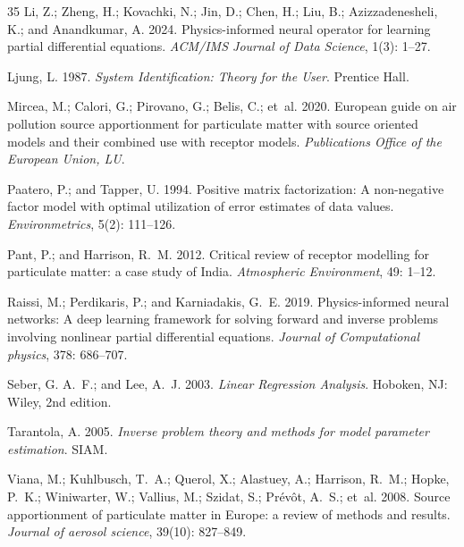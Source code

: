 \documentclass[letterpaper]{article} %
\theoremstyle{plain}
\theoremstyle{definition}
\theoremstyle{remark}
\begin{document}
\begin{thebibliography}{35}
Li, Z.; Zheng, H.; Kovachki, N.; Jin, D.; Chen, H.; Liu, B.; Azizzadenesheli,
  K.; and Anandkumar, A. 2024.
\newblock Physics-informed neural operator for learning partial differential
  equations.
\newblock \emph{ACM/IMS Journal of Data Science}, 1(3): 1--27.

Ljung, L. 1987.
\newblock \emph{System Identification: Theory for the User}.
\newblock Prentice Hall.

Mircea, M.; Calori, G.; Pirovano, G.; Belis, C.; et~al. 2020.
\newblock European guide on air pollution source apportionment for particulate
  matter with source oriented models and their combined use with receptor
  models.
\newblock \emph{Publications Office of the European Union, LU}.

Paatero, P.; and Tapper, U. 1994.
\newblock Positive matrix factorization: A non-negative factor model with
  optimal utilization of error estimates of data values.
\newblock \emph{Environmetrics}, 5(2): 111--126.

Pant, P.; and Harrison, R.~M. 2012.
\newblock Critical review of receptor modelling for particulate matter: a case
  study of India.
\newblock \emph{Atmospheric Environment}, 49: 1--12.

Raissi, M.; Perdikaris, P.; and Karniadakis, G.~E. 2019.
\newblock Physics-informed neural networks: A deep learning framework for
  solving forward and inverse problems involving nonlinear partial differential
  equations.
\newblock \emph{Journal of Computational physics}, 378: 686--707.

Seber, G. A.~F.; and Lee, A.~J. 2003.
\newblock \emph{Linear Regression Analysis}.
\newblock Hoboken, NJ: Wiley, 2nd edition.

Tarantola, A. 2005.
\newblock \emph{Inverse problem theory and methods for model parameter
  estimation}.
\newblock SIAM.

Viana, M.; Kuhlbusch, T.~A.; Querol, X.; Alastuey, A.; Harrison, R.~M.; Hopke,
  P.~K.; Winiwarter, W.; Vallius, M.; Szidat, S.; Pr{\'e}v{\^o}t, A.~S.; et~al.
  2008.
\newblock Source apportionment of particulate matter in Europe: a review of
  methods and results.
\newblock \emph{Journal of aerosol science}, 39(10): 827--849.


\end{thebibliography}
\end{document}
